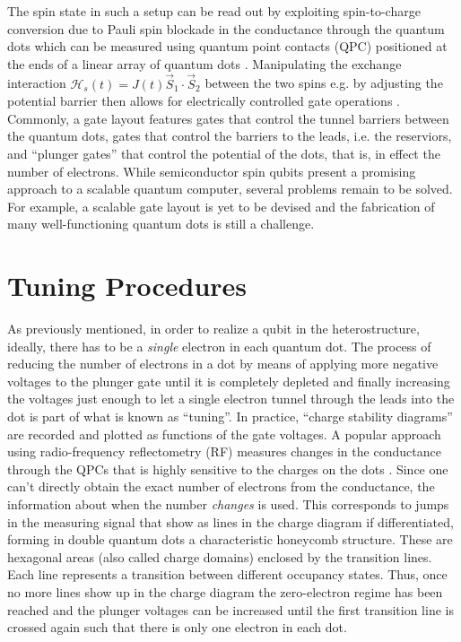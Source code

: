 The spin state in such a setup can be read out by exploiting spin-to-charge conversion due to Pauli spin blockade in the conductance through the quantum dots which can be measured using quantum point contacts (QPC) positioned at the ends of a linear array of quantum dots \cite{Vandersypen2004,Johnson2005,Hanson2007}. Manipulating the exchange interaction $\mathcal{H}_s(t) = J(t)\vec{S}_1\cdot\vec{S}_2$ between the two spins e.g. by adjusting the potential barrier then allows for electrically controlled gate operations \cite{Loss1998}. Commonly, a gate layout features gates that control the tunnel barriers between the quantum dots, gates that control the barriers to the leads, i.e. the reserviors, and \enquote{plunger gates} that control the potential of the dots, that is, in effect the number of electrons. While semiconductor spin qubits present a promising approach to a scalable quantum computer, several problems remain to be solved. For example, a scalable gate layout is yet to be devised and the fabrication of many well-functioning quantum dots is still a challenge.

\section{Tuning Procedures}
\label{sec:intro_tuning}
As previously mentioned, in order to realize a qubit in the heterostructure, ideally, there has to be a \textit{single} electron in each quantum dot. The process of reducing the number of electrons in a dot by means of applying more negative voltages to the plunger gate until it is completely depleted and finally increasing the voltages just enough to let a single electron tunnel through the leads into the dot is part of what is known as \enquote{tuning}. In practice, \enquote{charge stability diagrams} are recorded and plotted as functions of the gate voltages. A popular approach using radio-frequency reflectometry (RF) measures changes in the conductance through the QPCs that is highly sensitive to the charges on the dots \cite{Cassidy2007,Reilly2007}. Since one can't directly obtain the exact number of electrons from the conductance, the information about when the number \textit{changes} is used. This corresponds to jumps in the measuring signal that show as lines in the charge diagram if differentiated, forming in double quantum dots a characteristic honeycomb structure. These are hexagonal areas (also called charge domains) enclosed by the transition lines. Each line represents a transition between different occupancy states. Thus, once no more lines show up in the charge diagram the zero-electron regime has been reached and the plunger voltages can be increased until the first transition line is crossed again such that there is only one electron in each dot.

